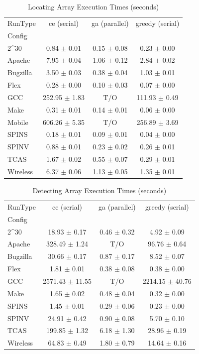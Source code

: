 \begin{table}[htbp]
\caption{Locating Array Execution Times (seconds)}
\label{tab:locating}
\begin{tabular}{lccc}
\toprule
RunType & ce (serial) & ga (parallel) & greedy (serial) \\
Config &  &  &  \\
\midrule
2^30 & 0.84 $\pm$ 0.01 & 0.15 $\pm$ 0.08 & 0.23 $\pm$ 0.00 \\
Apache & 7.95 $\pm$ 0.04 & 1.06 $\pm$ 0.12 & 2.84 $\pm$ 0.02 \\
Bugzilla & 3.50 $\pm$ 0.03 & 0.38 $\pm$ 0.04 & 1.03 $\pm$ 0.01 \\
Flex & 0.28 $\pm$ 0.00 & 0.10 $\pm$ 0.03 & 0.07 $\pm$ 0.00 \\
GCC & 252.95 $\pm$ 1.83 & T/O & 111.93 $\pm$ 0.49 \\
Make & 0.31 $\pm$ 0.01 & 0.14 $\pm$ 0.01 & 0.06 $\pm$ 0.00 \\
Mobile & 606.26 $\pm$ 5.35 & T/O & 256.89 $\pm$ 3.69 \\
SPINS & 0.18 $\pm$ 0.01 & 0.09 $\pm$ 0.01 & 0.04 $\pm$ 0.00 \\
SPINV & 0.88 $\pm$ 0.01 & 0.23 $\pm$ 0.02 & 0.26 $\pm$ 0.01 \\
TCAS & 1.67 $\pm$ 0.02 & 0.55 $\pm$ 0.07 & 0.29 $\pm$ 0.01 \\
Wireless & 6.37 $\pm$ 0.06 & 1.13 $\pm$ 0.05 & 1.35 $\pm$ 0.01 \\
\bottomrule
\end{tabular}
\end{table}

\vspace{1em}

\begin{table}[htbp]
\caption{Detecting Array Execution Times (seconds)}
\label{tab:detecting}
\begin{tabular}{lccc}
\toprule
RunType & ce (serial) & ga (parallel) & greedy (serial) \\
Config &  &  &  \\
\midrule
2^30 & 18.93 $\pm$ 0.17 & 0.46 $\pm$ 0.32 & 4.92 $\pm$ 0.09 \\
Apache & 328.49 $\pm$ 1.24 & T/O & 96.76 $\pm$ 0.64 \\
Bugzilla & 30.66 $\pm$ 0.17 & 0.87 $\pm$ 0.17 & 8.52 $\pm$ 0.07 \\
Flex & 1.81 $\pm$ 0.01 & 0.38 $\pm$ 0.08 & 0.38 $\pm$ 0.00 \\
GCC & 2571.43 $\pm$ 11.55 & T/O & 2214.15 $\pm$ 40.76 \\
Make & 1.65 $\pm$ 0.02 & 0.48 $\pm$ 0.04 & 0.32 $\pm$ 0.00 \\
SPINS & 1.45 $\pm$ 0.01 & 0.29 $\pm$ 0.06 & 0.23 $\pm$ 0.00 \\
SPINV & 24.91 $\pm$ 0.42 & 0.90 $\pm$ 0.08 & 5.70 $\pm$ 0.10 \\
TCAS & 199.85 $\pm$ 1.32 & 6.18 $\pm$ 1.30 & 28.96 $\pm$ 0.19 \\
Wireless & 64.83 $\pm$ 0.49 & 1.80 $\pm$ 0.79 & 14.64 $\pm$ 0.16 \\
\bottomrule
\end{tabular}
\end{table}

\vspace{1em}
